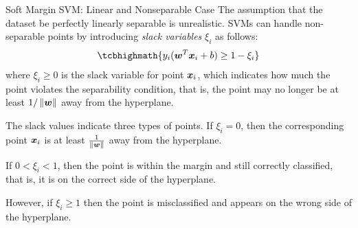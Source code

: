 \begin{frame}{Soft Margin SVM: Linear and Nonseparable Case}
The assumption that the dataset be perfectly linearly
separable is unrealistic. 
SVMs can handle non-separable
points by introducing {\em slack variables} $\xi_i$ 
as follows: 
\begin{align*}
\tcbhighmath{
y_{i} (\bw^{T}\bx_{i}+b) \geq 1-\xi_{i}
}
\end{align*}
where $\xi_i \ge 0$ is the slack variable for point ${\boldsymbol x}_i$, which
indicates how much the point violates the separability condition,
that is, the point may no longer be at least $1/\left\lVert{\boldsymbol w}\right\rVert$ away
from the hyperplane. 

\medskip
The slack values indicate three types of
points. If $\xi_i=0$, then the corresponding point ${\boldsymbol x}_i$ is at least
$1 \over \|{\boldsymbol w}\|$ away from the hyperplane. 

\medskip
If $0 < \xi_i
< 1$, then the point is within the margin and still correctly
classif\/{i}ed, that is, it is on the correct side of the hyperplane.

\medskip
However, if $\xi_i \ge 1$ then the point is misclassif\/{i}ed and
appears on the wrong side of the hyperplane.
\end{frame}





